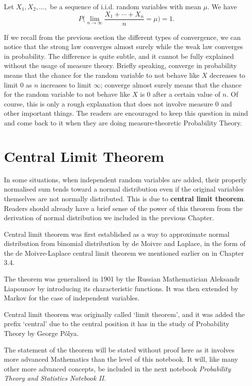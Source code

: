 \documentclass[11pt, a4paper, oneside]{book}
\theoremstyle{definition}
\begin{document}
\noindent Let $X_1, X_2, \dots,$ be a sequence of i.i.d. random variables with mean $\mu$. We have\[
P\Big(\lim_{n \to \infty} \frac{X_1 + \cdots + X_n}{n} = \mu\Big) = 1.
\]

\noindent If we recall from the previous section the different types of convergence, we can notice that the strong law converges almost surely while the weak law converges in probability. The difference is quite subtle, and it cannot be fully explained without the usage of measure theory. Briefly speaking, converge in probability means that the chance for the random variable to not behave like $X$ decreases to limit 0 as $n$ increases to limit $\infty$; converge almost surely means that the chance for the random variable to not behave like $X$ is 0 after a certain value of $n$. Of course, this is only a rough explanation that does not involve measure 0 and other important things. The readers are encouraged to keep this question in mind and come back to it when they are doing measure-theoretic Probability Theory. 

\section{Central Limit Theorem}

\noindent In some situations, when independent random variables are added, their properly normalised sum tends toward a normal distribution even if the original variables themselves are not normally distributed. This is due to \textbf{central limit theorem}. Readers should already have a brief sense of the power of this theorem from the derivation of normal distribution we included in the previous Chapter. 

\noindent Central limit theorem was first established as a way to approximate normal distribution from binomial distribution by de Moivre and Laplace, in the form of the de Moivre-Laplace central limit theorem we mentioned earlier on in Chapter 3.4. 

\noindent The theorem was generalised in 1901 by the Russian Mathematician Aleksandr Liapounov by introducing its characteristic functions. It was then extended by Markov for the case of independent variables. 

\noindent Central limit theorem was originally called `limit theorem', and it was added the prefix `central' due to the central position it has in the study of Probability Theory by George Pólya. 

\noindent The statement of the theorem will be stated without proof here as it involves more advanced Mathematics than the level of this notebook. It will, like many other more advanced concepts, be included in the next notebook \emph{Probability Theory and Statistics Notebook II}.
\end{document}
